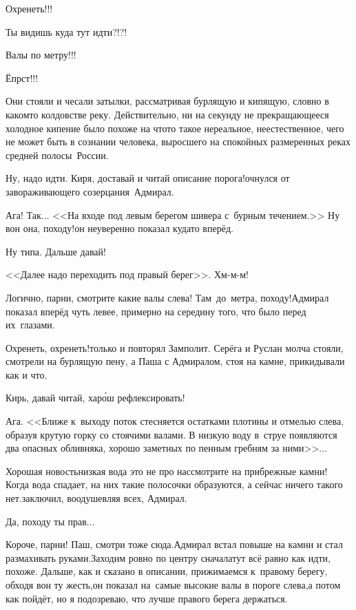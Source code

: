 \diagdash Охренеть!!!

\diagdash Ты видишь куда тут идти?!?!

\diagdash Валы по метру!!!

\diagdash Ёпрст!!!

Они стояли и чесали затылки, рассматривая бурлящую и кипящую, словно в каком\sdash то колдовстве реку. Действительно, ни на секунду не прекращающееся холодное кипение было похоже на что\sdash то такое нереальное, неестественное, чего не может быть в сознании человека, выросшего на спокойных размеренных реках средней полосы~России.

\diagdash Ну, надо идти. Киря, доставай и читай описание порога!\mdash очнулся от завораживающего созерцания~Адмирал.

\diagdash Ага! Так$\ldots$ <<На входе под левым берегом шивера с~бурным течением.>> Ну вон она, походу!\mdash он неуверенно показал куда\sdash то вперёд.

\diagdash Ну типа. Дальше давай!

\diagdash <<Далее надо переходить под правый берег>>. Хм-м-м!

\diagdash Логично, парни, смотрите какие валы слева! Там~до~метра, походу!\mdash Адмирал показал вперёд чуть левее, примерно на середину того, что было перед их~глазами.

\diagdash Охренеть, охренеть!\mdash только и повторял Замполит. Серёга и Руслан молча стояли, смотрели на бурлящую пену, а Паша с Адмиралом, стоя на камне, прикидывали как и что.

\diagdash Кирь, давай читай, хар{\'о}ш рефлексировать!

\diagdash Ага. <<Ближе к~выходу поток стесняется остатками плотины и отмелью слева, образуя крутую горку со стоячими валами. В низкую воду в~струе появляются два опасных обливняка, хорошо заметных по пенным гребням за ними>>$\ldots$

\diagdash Хорошая новость\mdash низкая вода это не про нас\mdash смотрите на прибрежные камни! Когда вода спадает, на них такие полосочки образуются, а сейчас ничего такого нет.\mdash заключил, воодушевляя всех, Адмирал.

\diagdash Да, походу ты прав$\ldots$

\diagdash Короче, парни! Паш, смотри тоже сюда.\mdash Адмирал встал повыше на камни и стал размахивать руками.\mdash Заходим ровно по центру сначала\mdash тут всё равно как идти, похоже. Дальше, как и сказано в описании, прижимаемся к~правому берегу, обходя вон ту жесть,\mdash он показал на~самые высокие валы в пороге слева,\mdash а потом как пойдёт, но я подозреваю, что лучше правого берега держаться.

